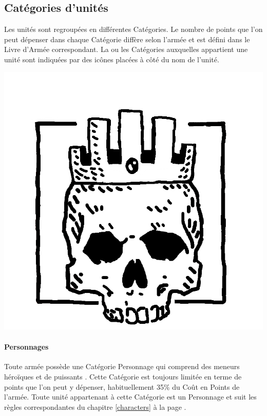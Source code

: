 \subsection{Catégories d'unités}

Les unités sont regroupées en différentes Catégories. Le nombre de points que l'on peut dépenser dans chaque Catégorie diffère selon l'armée et est défini dans le Livre d'Armée correspondant. La ou les Catégories auxquelles appartient une unité sont indiquées par des icônes placées à côté du nom de l'unité.

\begin{minipage}[c]{0.17\textwidth}
\includegraphics[width=\textwidth]{../Layout/pics/logo_lord.png}
\end{minipage}\hfill
\begin{minipage}[c]{0.80\textwidth}
\paragraph{Personnages}

Toute armée possède une Catégorie Personnage qui comprend des meneurs héroïques et de puissants \expandafter\lowercase\expandafter{\wizards}. Cette Catégorie est toujours limitée en terme de points que l'on peut y dépenser, habituellement 35\% du Coût en Points de l'armée. Toute unité appartenant à cette Catégorie est un Personnage et suit les règles correspondantes du chapitre \ref{characters} à la page \pageref{characters}.
\end{minipage}

